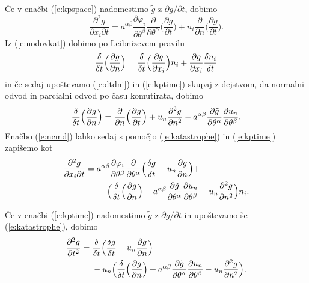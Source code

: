 Če v enačbi (\ref{e:kpspace}) nadomestimo $\tilde{g}$ z $\partial g/\partial t$, dobimo
\begin{equation} \label{e:ncmd}
	\frac{\partial^2 g}{\partial x_i\partial t}=
	a^{\alpha\beta}\frac{\partial\varphi_i}{\partial\theta^{\beta}}
	\frac{\partial}{\partial\theta^{\alpha}}\Big(\frac{\partial g}{\partial t}\Big)+
	n_i\frac{\partial}{\partial n}\Big(\frac{\partial g}{\partial t}\Big).
\end{equation}
Iz (\ref{e:nodovkat}) dobimo po Leibnizevem pravilu
\[
	\frac{\delta}{\delta t}\Big(\frac{\partial g}{\partial n}\Big)=
	\frac{\delta}{\delta t}\Big(\frac{\partial g}{\partial x_i}\Big)n_i+
	\frac{\partial g}{\partial x_i}\frac{\delta n_i}{\delta t}
\]
in če sedaj upoštevamo (\ref{e:dtdni}) in (\ref{e:kptime}) skupaj z dejstvom, da normalni odvod
in parcialni odvod po času komutirata, dobimo
\begin{equation} \label{e:katastrophe}
	\frac{\delta}{\delta t}\Big(\frac{\partial g}{\partial n}\Big)=
	\frac{\partial}{\partial n}\Big(\frac{\partial g}{\partial t}\Big)+
	u_n\frac{\partial^2 g}{\partial n^2}-
	a^{\alpha\beta}\frac{\partial\tilde{g}}{\partial\theta^{\alpha}}\frac{\partial u_n}{\partial\theta^{\beta}}.
\end{equation}
Enačbo (\ref{e:ncmd}) lahko sedaj s pomočjo (\ref{e:katastrophe}) in (\ref{e:kptime})
zapišemo kot
\begin{align}
	\frac{\partial^2 g}{\partial x_i\partial t}=\;&
	a^{\alpha\beta}\frac{\partial\varphi_i}{\partial\theta^{\beta}}
	\frac{\partial}{\partial\theta^{\alpha}}
	\Big(\frac{\delta g}{\delta t}-u_n\frac{\partial g}{\partial n}\Big)+ \nonumber \\
	&+\Big(\frac{\delta}{\delta t}\Big(\frac{\partial g}{\partial n}\Big)+
	a^{\alpha\beta}\frac{\partial\tilde{g}}{\partial\theta^{\alpha}}
	\frac{\partial u_n}{\partial\theta^{\beta}}-u_n\frac{\partial^2 g}{\partial n^2}\Big)n_i.
	\label{e:kpzdpo2}
\end{align}

Če v enačbi (\ref{e:kptime}) nadomestimo $\tilde{g}$ z $\partial g/\partial t$
in upoštevamo še (\ref{e:katastrophe}), dobimo
\begin{align}
	\frac{\partial^2 g}{\partial t^2}=\;&
	\frac{\delta}{\delta t}\Big(\frac{\delta g}{\delta t}-u_n\frac{\partial g}{\partial n}\Big)- \nonumber \\
	&-u_n\Big(\frac{\delta}{\delta t}\Big(\frac{\partial g}{\partial n}\Big)+
	a^{\alpha\beta}\frac{\partial\tilde{g}}{\partial\theta^{\alpha}}
	\frac{\partial u_n}{\partial\theta^{\beta}}-u_n\frac{\partial^2 g}{\partial n^2}\Big).
	\label{e:kpzdpo3}
\end{align}

